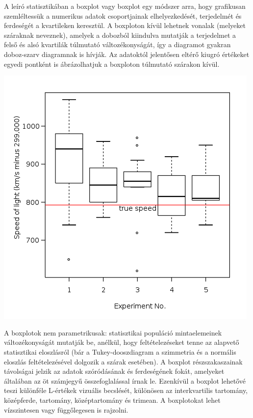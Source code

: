 \documentclass[11pt,a4paper]{article}
\begin{document}
  \begin{tcolorbox}[colback=MidnightBlue!5!white,colframe=MidnightBlue!60!black,title= Box plot]
    \begin{multicols*}{2}
        A leíró statisztikában a boxplot vagy boxplot egy módszer arra, hogy grafikusan szemléltessük a numerikus adatok csoportjainak elhelyezkedését, terjedelmét és ferdeségét a kvartileken keresztül. A boxploton kívül lehetnek vonalak (melyeket száraknak neveznek), amelyek a dobozból kiindulva mutatják a terjedelmet a felső és alsó kvartilák túlmutató változékonyságát, így a diagramot gyakran doboz-szarv diagramnak is hívják. Az adatoktól jelentősen eltérő kiugró értékeket egyedi pontként is ábrázolhatjuk a boxploton túlmutató szárakon kívül.
        \columnbreak
            \begin{center}
                \includegraphics*[width=.35\textwidth]{box.png}
            \end{center}
        \end{multicols*}
        A boxplotok nem parametrikusak: statisztikai populáció mintaelemeinek változékonyságát mutatják be, anélkül, hogy feltételezéseket tenne az alapvető statisztikai eloszlásról (bár a Tukey-dooszdiagram a szimmetria és a normális eloszlás feltételezésével dolgozik a szárak esetében). A boxplot részszakaszainak távolságai jelzik az adatok szóródásának és ferdeségének fokát, amelyeket általában az öt számjegyű összefoglalással írnak le. Ezenkívül a boxplot lehetővé teszi különféle L-értékek vizuális becslését, különösen az interkvartilis tartomány, középferde, tartomány, középtartomány és trimean. A boxplotokat lehet vízszintesen vagy függőlegesen is rajzolni.
\end{tcolorbox}
\end{document}
